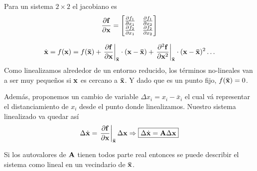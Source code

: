 \documentclass[11pt, a4paper, twoside, openright, openany]{book}
\begin{document}
Para un sistema \(2\times 2\) el jacobiano es
\[
\frac{\partial {\mathbf{f}}}{\partial {\mathbf{x}}}=
\begin{bmatrix}
\frac{\partial {f_1}}{\partial {x_1}} &\frac{\partial {f_1}}{\partial {x_2}} \\
\frac{\partial {f_2}}{\partial {x_1}} & \frac{\partial {f_2}}{\partial {x_2}}
\end{bmatrix}
\]


\[
\dot{\mathbf{x}} = f(\mathbf{x}) = f(\mathbf{\bar{x}}) + \left. \frac{\partial {\mathbf{f}}}{\partial {\mathbf{x}}}\right|_{\mathbf{\bar{x}}}\cdot (\mathbf{x}-\mathbf{\bar{x}}) + \left.\frac{\partial^2 \mathbf{f}}{\partial \mathbf{x} ^2} \right|_{\mathbf{\bar{x}}}\cdot (\mathbf{x}-\mathbf{\bar{x}})^2 \ldots
\]
Como linealizamos alrededor de un entorno reducido, los términos no-lineales van a ser muy pequeños si $\mathbf{x}$ es cercano a $\mathbf{\bar{x}}$. Y dado que es un punto fijo, $f(\mathbf{\bar{x}})=0$.

Además, proponemos un cambio de variable $\Delta x_i =  x_i - \bar{x}_i$ el cual vá representar el distanciamiento de $x_i$ desde el punto donde linealizamos. Nuestro sistema linealizado va quedar así
\[
\Delta \dot{\mathbf{x}} = \left.\frac{\partial {\mathbf{f}}}{\partial {\mathbf{x}}}\right|_{\mathbf{\bar{x}}} \Delta \mathbf{x} \Rightarrow \boxed{\Delta \dot{\mathbf{x}} = \mathbf{A} \Delta \mathbf{x} }
\]

\begin{theorem}
Si los autovalores de $\mathbf{A}$ tienen todos parte real entonces se puede describir el sistema como lineal en un vecindario de $\mathbf{\bar{x}}$.
\end{theorem}
\end{document}
